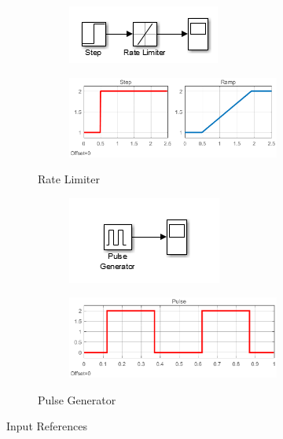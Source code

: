\begin{figure}[h]
\centering
\begin{subfigure}{\textwidth}
\begin{subfigure}{.48\textwidth}
\centering
\includegraphics[width=.7\textwidth]{Figs/ratelim2.PNG}
\end{subfigure}
\begin{subfigure}{.48\textwidth}
\includegraphics[width=\textwidth]{Figs/ratelimsim.eps}
\end{subfigure}
\caption{Rate Limiter}
\label{fig:ratelim}
\end{subfigure}
\begin{subfigure}{\textwidth}
\begin{subfigure}{.48\textwidth}
\centering
\includegraphics[width=.7\textwidth]{Figs/pulse.PNG}
\end{subfigure}
\begin{subfigure}{.48\textwidth}
\includegraphics[width=\textwidth]{Figs/pulsesim.eps}
\end{subfigure}
\caption{Pulse Generator}
\label{fig:pulsegen}
\end{subfigure}
\caption{Input References}
\end{figure}
